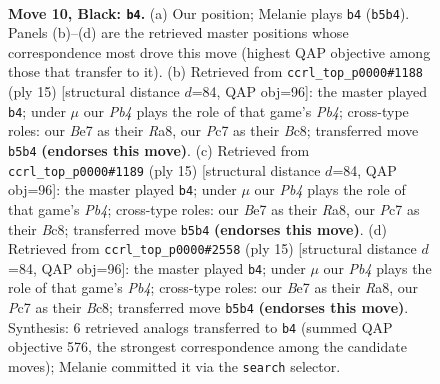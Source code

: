 \documentclass[11pt]{article}
\begin{document}
\clearpage

\begin{figure}[p]\centering
\begin{subfigure}{0.46\textwidth}\centering
\resizebox{\linewidth}{!}{%
\newchessgame
\chessboard[
  setfen={r2q1rk1/2pbbppp/p1np1n2/1p2p1N1/P3P3/1B3Q2/1PPP1PPP/RNB1R1K1 b - - 4 10},
  showmover=false,
  pgfstyle=straightmove, color=movearrow, markmove={b5-b4}
]}
\caption{}
\end{subfigure}\hfill
\begin{subfigure}{0.46\textwidth}\centering
\resizebox{\linewidth}{!}{%
\newchessgame
\chessboard[
  setfen={r1bq1rk1/2ppbppp/p1n2n2/1p2p3/P3P3/1B3N2/1PPP1PPP/RNBQR1K1 b - - 0 8},
  showmover=false,
  pgfstyle=straightmove, color=movearrow, markmove={b5-b4}
]}
\caption{}
\end{subfigure}
\\[4pt]
\begin{subfigure}{0.46\textwidth}\centering
\resizebox{\linewidth}{!}{%
\newchessgame
\chessboard[
  setfen={r1bq1rk1/2ppbppp/p1n2n2/1p2p3/P3P3/1B3N2/1PPP1PPP/RNBQR1K1 b - - 0 8},
  showmover=false,
  pgfstyle=straightmove, color=movearrow, markmove={b5-b4}
]}
\caption{}
\end{subfigure}\hfill
\begin{subfigure}{0.46\textwidth}\centering
\resizebox{\linewidth}{!}{%
\newchessgame
\chessboard[
  setfen={r1bq1rk1/2ppbppp/p1n2n2/1p2p3/P3P3/1B3N2/1PPP1PPP/RNBQR1K1 b - - 0 8},
  showmover=false,
  pgfstyle=straightmove, color=movearrow, markmove={b5-b4}
]}
\caption{}
\end{subfigure}
\caption{\textbf{Move 10, Black: \texttt{b4}.} (a) Our position; Melanie plays \texttt{b4} (\texttt{b5b4}). Panels (b)--(d) are the retrieved master positions whose correspondence most drove this move (highest QAP objective among those that transfer to it). (b) Retrieved from \texttt{ccrl\_top\_p0000\#1188} (ply 15) [structural distance $d$=84, QAP obj=96]: the master played \texttt{b4}; under $\mu$ our \emph{Pb4} plays the role of that game's \emph{Pb4}; cross-type roles: our \emph{B}e7 as their \emph{R}a8, our \emph{P}c7 as their \emph{B}c8; transferred move \texttt{b5b4} \textbf{(endorses this move)}. (c) Retrieved from \texttt{ccrl\_top\_p0000\#1189} (ply 15) [structural distance $d$=84, QAP obj=96]: the master played \texttt{b4}; under $\mu$ our \emph{Pb4} plays the role of that game's \emph{Pb4}; cross-type roles: our \emph{B}e7 as their \emph{R}a8, our \emph{P}c7 as their \emph{B}c8; transferred move \texttt{b5b4} \textbf{(endorses this move)}. (d) Retrieved from \texttt{ccrl\_top\_p0000\#2558} (ply 15) [structural distance $d$=84, QAP obj=96]: the master played \texttt{b4}; under $\mu$ our \emph{Pb4} plays the role of that game's \emph{Pb4}; cross-type roles: our \emph{B}e7 as their \emph{R}a8, our \emph{P}c7 as their \emph{B}c8; transferred move \texttt{b5b4} \textbf{(endorses this move)}. Synthesis: 6 retrieved analogs transferred to \texttt{b4} (summed QAP objective 576, the strongest correspondence among the candidate moves); Melanie committed it via the \texttt{search} selector.}
\label{fig:thought-m19}
\end{figure}
\end{document}
